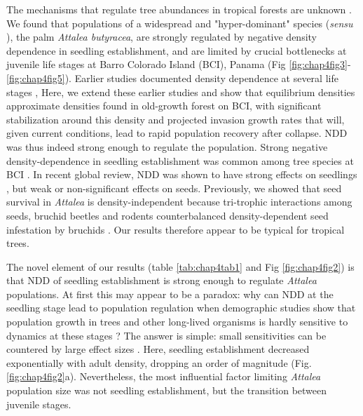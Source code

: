 \documentclass[b5paper,justified]{tufte-book} %
\begin{document}
\begin{fullwidth}
The mechanisms that regulate tree abundances in tropical forests are unknown \citep{Wright2002, Leigh2004, Siepielski2010, Vellend2010}. We found that populations of a widespread and "hyper-dominant" species (\textit{sensu}  \citealt{Steege2013}), the palm \textit{Attalea butyracea}, are strongly regulated by negative density dependence in seedling establishment, and are limited by crucial bottlenecks at juvenile life stages at Barro Colorado Island (BCI), Panama (Fig \ref{fig:chap4fig3}-\ref{fig:chap4fig5}). Earlier studies documented density dependence at several life stages \citep{Wright1983, Visser2011a, Jansen2014}, Here, we extend these earlier studies and show that equilibrium densities approximate densities found in old-growth forest on BCI, with significant stabilization around this density and projected invasion growth rates that will, given current conditions, lead to rapid population recovery after collapse. NDD was thus indeed strong enough to regulate the population.   Strong negative density-dependence in seedling establishment was common among tree species at BCI \citep[e.g.][]{Harms2000a}.  In recent global review, NDD was shown to have strong effects on seedlings \citep{Comita2014}, but weak or non-significant effects on seeds.  Previously, we showed that seed survival in \textit{Attalea} is density-independent because tri-trophic interactions among seeds, bruchid beetles and rodents counterbalanced density-dependent seed infestation by bruchids \citep{Visser2011a}.  Our results therefore appear to be typical for tropical trees.

The novel element of our results (table \ref{tab:chap4tab1} and Fig \ref{fig:chap4fig2}) is that NDD of seedling establishment is strong enough to regulate \textit{Attalea} populations. At first this may appear to be a paradox: why can NDD at the seedling stage lead to population regulation when demographic studies show that population growth in trees and other long-lived organisms is hardly sensitive to dynamics at these stages \citep{DeKroon2000, Visser2011}? The answer is simple:  small sensitivities can be countered by large effect sizes \citep[see e.g.][]{Zuidema2001}. Here, seedling establishment decreased exponentially with adult density, dropping an order of magnitude (Fig. \ref{fig:chap4fig2}a).  Nevertheless, the most influential factor limiting \textit{Attalea} population size was not seedling establishment, but the transition between juvenile stages.  


\end{fullwidth}
\end{document}
